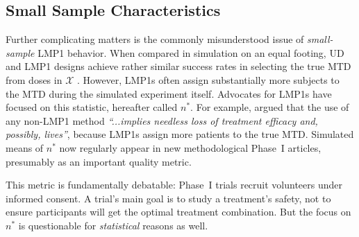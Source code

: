 \subsection{Small Sample Characteristics}
Further complicating matters is the commonly misunderstood issue of \emph{small-sample} LMP1 behavior. When compared in simulation on an equal footing, UD and LMP1 designs achieve rather similar success rates in selecting the true MTD from doses in $\mathcal{X}$ \citep{Oron:Hoff:smal:2013}. However, LMP1s often assign substantially more subjects to the MTD during the simulated experiment itself. Advocates for LMP1s have focused on this statistic, hereafter called $n^*$. For example, \cite{Rogat:etal:oped:2007} argued that the use of any non-LMP1 method \emph{``...implies needless loss of treatment efficacy and, possibly, lives''}, because LMP1s assign more patients to the true MTD. Simulated means of $n^*$ now regularly appear in new methodological Phase~I articles, presumably as an important quality metric.

This metric is fundamentally debatable: Phase~I trials recruit volunteers under informed consent. A trial's main goal is to study a treatment's safety, not to ensure participants will get the optimal treatment combination. But the focus on $n^*$ is questionable for \emph{statistical} reasons as well.

